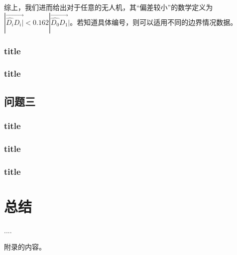 \documentclass[withoutpreface,bwprint]{cumcmthesis} %
\begin{document}
			综上，我们进而给出对于任意的无人机，其“偏差较小”的数学定义为$|\overrightarrow{\widehat{D_i}D_i|}<0.162|\overrightarrow{\widehat{D_0}D_1}|$。若知道具体编号，则可以适用不同的边界情况数据。
			\subsubsection{title}
			\subsubsection{title}
		\subsection{问题三}
			\subsubsection{title}
			\subsubsection{title}
			\subsubsection{title}
	\section{总结}
	\begin{thebibliography}{9}%
		 ....
	\end{thebibliography}
	\begin{appendices}
		附录的内容。
	\end{appendices}
\end{document}
